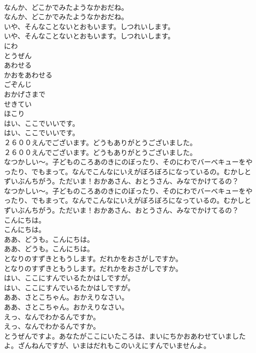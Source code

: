 \documentclass[8pt]{extreport}
\begin{document}
\begin{CJK}{UTF8}{min}
\\	なんか、どこかでみたようなかおだね。
\\	なんか、どこかでみたようなかおだね。
\\	いや、そんなことないとおもいます。しつれいします。
\\	いや、そんなことないとおもいます。しつれいします。
\\	にわ
\\	とうぜん
\\	あわせる
\\	かおをあわせる
\\	ごぞんじ
\\	おかげさまで
\\	せきてい
\\	ほこり
\\	はい、ここでいいです。
\\	はい、ここでいいです。
\\	２６００えんでございます。どうもありがとうございました。
\\	２６００えんでございます。どうもありがとうございました。
\\	なつかしい〜。子どものころあのきにのぼったり、そのにわでバーベキューをやったり、でもまって。なんでこんなにいえがぼろぼろになっているの。むかしとずいぶんちがう。ただいま！おかあさん、おとうさん、みなでかけてるの？
\\	なつかしい〜。子どものころあのきにのぼったり、そのにわでバーベキューをやったり、でもまって。なんでこんなにいえがぼろぼろになっているの。むかしとずいぶんちがう。ただいま！おかあさん、おとうさん、みなでかけてるの？
\\	こんにちは。
\\	こんにちは。
\\	ああ、どうも。こんにちは。
\\	ああ、どうも。こんにちは。
\\	となりのすずきともうします。だれかをおさがしですか。
\\	となりのすずきともうします。だれかをおさがしですか。
\\	はい、ここにすんでいるたかはしですが。
\\	はい、ここにすんでいるたかはしですが。
\\	ああ、さとこちゃん。おかえりなさい。
\\	ああ、さとこちゃん。おかえりなさい。
\\	えっ、なんでわかるんですか。
\\	えっ、なんでわかるんですか。
\\	とうぜんですよ。あなたがここにいたころは、まいにちかおあわせていましたよ。ざんねんですが、いまはだれもこのいえにすんでいませんよ。

\end{CJK}
\end{document}
